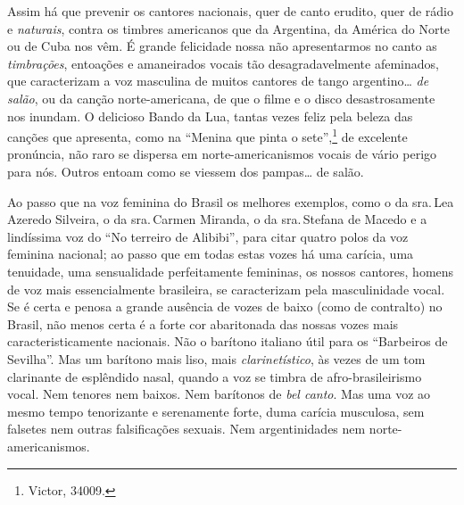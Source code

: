 Assim há que prevenir os cantores nacionais, quer de canto erudito, quer
de rádio e \textit{naturais}, contra os timbres americanos que da Argentina,
da América do Norte ou de Cuba nos vêm. É grande felicidade nossa não
apresentarmos no canto as \textit{timbrações}, entoações e amaneirados vocais tão
desagradavelmente afeminados, que caracterizam a voz masculina de muitos
cantores de tango argentino\ldots{} \textit{de salão}, ou da canção
norte-americana, de que o filme e o disco desastrosamente nos inundam. O
delicioso Bando da Lua, tantas vezes feliz pela beleza das canções que
apresenta, como na ``Menina que pinta o sete'',\footnote{Victor, 34009.} de
excelente pronúncia, não raro se dispersa em norte-americanismos vocais
de vário perigo para nós. Outros entoam como se viessem dos pampas\ldots{} de
salão.

Ao passo que na voz feminina do Brasil os melhores exemplos, como o da
sra.\,Lea Azeredo Silveira, o da sra.\,Carmen Miranda, o da sra.\,Stefana
de Macedo e a lindíssima voz do ``No terreiro de Alibibi'', para citar
quatro polos da voz feminina nacional; ao passo que em todas estas vozes
há uma carícia, uma tenuidade, uma sensualidade perfeitamente femininas,
os nossos cantores, homens de voz mais essencialmente brasileira, se
caracterizam pela masculinidade vocal. Se é certa e penosa a grande
ausência de vozes de baixo (como de contralto) no Brasil, não menos
certa é a forte cor abaritonada das nossas vozes mais
caracteristicamente nacionais. Não o barítono italiano útil para os
``Barbeiros de Sevilha''. Mas um barítono mais liso, mais
\textit{clarinetístico}, às vezes de um tom clarinante de esplêndido nasal,
quando a voz se timbra de afro-brasileirismo vocal. Nem tenores nem
baixos. Nem barítonos de \textit{bel canto}. Mas uma voz ao mesmo tempo
tenorizante e serenamente forte, duma carícia musculosa, sem falsetes
nem outras falsificações sexuais. Nem argentinidades nem
norte-americanismos.

